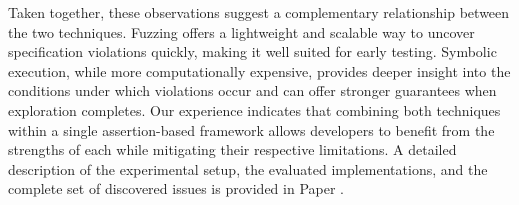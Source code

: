 Taken together, these observations suggest a complementary relationship between the two techniques.
Fuzzing offers a lightweight and scalable way to uncover specification violations quickly, making it well suited for early testing.
Symbolic execution, while more computationally expensive, provides deeper insight into the conditions under which violations occur and can offer stronger guarantees when exploration completes.
Our experience indicates that combining both techniques within a single assertion-based framework allows developers to benefit from the strengths of each while mitigating their respective limitations.
A detailed description of the experimental setup, the evaluated implementations, and the complete set of discovered issues is provided in Paper .

